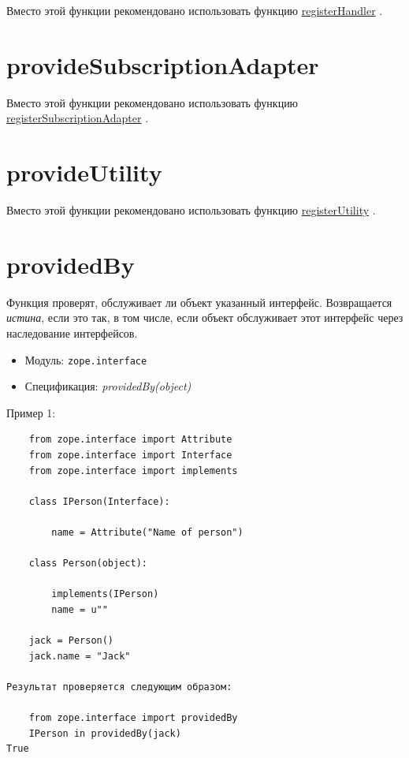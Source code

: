 \documentclass[a4paper,openany,twoside,final]{book}
\providecommand*{\DUroletitlereference}[1]{\textsl{#1}}
\begin{document}
Вместо этой функции рекомендовано использовать функцию \hyperref[registerhandler]{registerHandler} .


\section*{provideSubscriptionAdapter%
  \label{providesubscriptionadapter}%
}

Вместо этой функции рекомендовано использовать функцию \hyperref[registersubscriptionadapter]{registerSubscriptionAdapter} .


\section*{provideUtility%
  \label{provideutility}%
}

Вместо этой функции рекомендовано использовать функцию \hyperref[registerutility]{registerUtility} .


\section*{providedBy%
  \label{providedby}%
}

Функция проверят, обслуживает ли объект указанный интерфейс.  Возвращается \DUroletitlereference{истина}, если это так, в том числе, если объект обслуживает этот интерфейс через наследование интерфейсов.

\begin{itemize}

\item Модуль: \texttt{zope.interface}

\item Спецификация: \DUroletitlereference{providedBy(object)}

\end{itemize}

Пример 1:

\begin{verbatim}
    from zope.interface import Attribute
    from zope.interface import Interface
    from zope.interface import implements

    class IPerson(Interface):

        name = Attribute("Name of person")

    class Person(object):

        implements(IPerson)
        name = u""

    jack = Person()
    jack.name = "Jack"

Результат проверяется следующим образом:

    from zope.interface import providedBy
    IPerson in providedBy(jack)
True
\end{verbatim}
\end{document}

